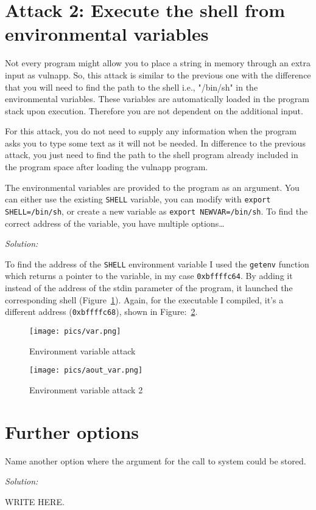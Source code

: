 \documentclass[a4paper,11pt]{article}
\newenvironment{solution}%
{\par{\noindent\small\textit{Solution:}}\vspace{-12pt}\begin{framed}}%
{\end{framed}\par}
\begin{document}
\section*{Attack 2: Execute the shell from environmental variables}

Not every program might allow you to place a string in memory through an extra
input as vulnapp. So, this attack is similar to the previous one with the
difference that you will need to find the path to the shell i.e., "/bin/sh" in
the environmental variables.  These variables are automatically loaded in the
program stack upon execution. Therefore you are not dependent on the additional
input.

For this attack, you do not need to supply any information when the program asks you
to type some text as it will not be needed. In difference to the previous attack,
you just need to find the path to the shell program already included in the program
space after loading the vulnapp program.

The environmental variables are provided to the program as an argument. You can
either use the existing \texttt{SHELL} variable, you can modify with
\texttt{export SHELL=/bin/sh}, or create a new variable as \texttt{export
NEWVAR=/bin/sh}. To find the correct address of the variable, you have multiple
options\dots

\ifsolution\begin{solution}
To find the address of the \texttt{SHELL} environment variable I used the \texttt{getenv}
function which returns a pointer to the variable, in my case \texttt{0xbffffc64}.
By adding it instead of the address of the stdin parameter of the program, it launched
the corresponding shell (Figure~\ref{fig:var}). Again, for the executable I compiled,
it's a different address (\texttt{0xbffffc68}), shown in Figure:~\ref{fig:aoutvar}.

\end{solution}\fi

\begin{figure}[H] \center
  \texttt{[image: pics/var.png]}
  \caption{Environment variable attack}
  \label{fig:var}
\end{figure}

\begin{figure}[H] \center
  \texttt{[image: pics/aout\_var.png]}
  \caption{Environment variable attack 2}
  \label{fig:aoutvar}
\end{figure}

\section*{Further options}
Name another option where the argument for the call to system could be stored.
\ifsolution\begin{solution}
WRITE HERE.
\end{solution}\fi
\end{document}
